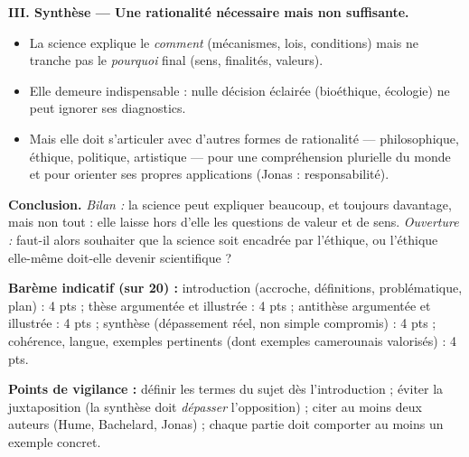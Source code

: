 \documentclass[11pt]{article}
\newcommand{\cle}[1]{{\popxbold\color{popdark}#1}}
\begin{document}
\begin{corrige}
\textbf{III. Synthèse — Une rationalité nécessaire mais non suffisante.}
\begin{itemize}
    \item La science explique le \emph{comment} (mécanismes, lois, conditions) mais ne tranche pas le \emph{pourquoi} final (sens, finalités, valeurs).
    \item Elle demeure \cle{indispensable} : nulle décision éclairée (bioéthique, écologie) ne peut ignorer ses diagnostics.
    \item Mais elle doit s'articuler avec d'autres formes de rationalité — philosophique, éthique, politique, artistique — pour une compréhension plurielle du monde et pour orienter ses propres applications (Jonas : responsabilité).
\end{itemize}

\textbf{Conclusion.} \emph{Bilan :} la science peut expliquer beaucoup, et toujours davantage, mais non tout : elle laisse hors d'elle les questions de valeur et de sens. \emph{Ouverture :} faut-il alors souhaiter que la science soit encadrée par l'éthique, ou l'éthique elle-même doit-elle devenir scientifique ?

\textbf{Barème indicatif (sur 20) :} introduction (accroche, définitions, problématique, plan) : 4 pts ; thèse argumentée et illustrée : 4 pts ; antithèse argumentée et illustrée : 4 pts ; synthèse (dépassement réel, non simple compromis) : 4 pts ; cohérence, langue, exemples pertinents (dont exemples camerounais valorisés) : 4 pts.

\textbf{Points de vigilance :} définir les termes du sujet dès l'introduction ; éviter la juxtaposition (la synthèse doit \emph{dépasser} l'opposition) ; citer au moins deux auteurs (Hume, Bachelard, Jonas) ; chaque partie doit comporter au moins un exemple concret.
\end{corrige}
\end{document}

